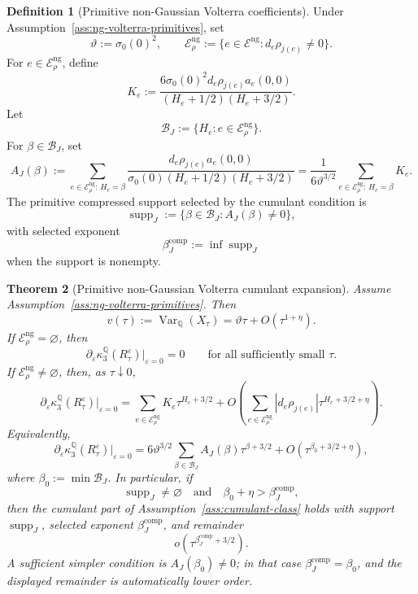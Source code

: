 \documentclass[11pt,a4paper]{amsart}
\theoremstyle{plain}
\newtheorem{theorem}{Theorem}[section]
\theoremstyle{definition}
\newtheorem{definition}[theorem]{Definition}
\theoremstyle{remark}
\DeclareMathOperator{\Var}{Var}
\newcommand{\QQ}{\mathbb{Q}}
\newcommand{\cE}{\mathcal{E}}
\begin{document}
\begin{definition}[Primitive non-Gaussian Volterra coefficients]\label{def:ng-volterra-coefficients}
Under Assumption~\ref{ass:ng-volterra-primitives}, set
\[
        \vartheta:=\sigma_0(0)^2,
        \qquad
        \cE_\rho^{\mathrm{ng}}:=\{e\in\cE^{\mathrm{ng}}:d_e\rho_{j(e)}\ne0\}.
\]
For \(e\in\cE_\rho^{\mathrm{ng}}\), define
\[
        K_e
        :=
        \frac{6\sigma_0(0)^2d_e\rho_{j(e)}a_e(0,0)}{(H_e+1/2)(H_e+3/2)}.
\]
Let
\[
        \mathcal B_J:=\{H_e:e\in\cE_\rho^{\mathrm{ng}}\}.
\]
For \(\beta\in\mathcal B_J\), set
\[
        A_J(\beta)
        :=
        \sum_{e\in\cE_\rho^{\mathrm{ng}}:\,H_e=\beta}
        \frac{d_e\rho_{j(e)}a_e(0,0)}{\sigma_0(0)(H_e+1/2)(H_e+3/2)}
        =
        \frac{1}{6\vartheta^{3/2}}
        \sum_{e\in\cE_\rho^{\mathrm{ng}}:\,H_e=\beta}K_e .
\]
The primitive compressed support selected by the cumulant condition is
\[
        \operatorname{supp}_J:=\{\beta\in\mathcal B_J:A_J(\beta)\ne0\},
\]
with selected exponent
\[
        \beta_J^{\mathrm{comp}}:=\inf \operatorname{supp}_J
\]
when the support is nonempty.
\end{definition}

\begin{theorem}[Primitive non-Gaussian Volterra cumulant expansion]\label{thm:ng-volterra-cumulants}
Assume Assumption~\ref{ass:ng-volterra-primitives}.  Then
\[
        v(\tau):=\Var_\QQ(X_\tau)
        =
        \vartheta\tau+O(\tau^{1+\eta}).
\]
If \(\cE_\rho^{\mathrm{ng}}=\varnothing\), then
\[
        \partial_\varepsilon\kappa_3^\QQ(R_\tau^\varepsilon)\big|_{\varepsilon=0}=0
        \qquad
        \text{for all sufficiently small }\tau.
\]
If \(\cE_\rho^{\mathrm{ng}}\ne\varnothing\), then, as \(\tau\downarrow0\),
\[
        \partial_\varepsilon\kappa_3^\QQ(R_\tau^\varepsilon)\big|_{\varepsilon=0}
        =
        \sum_{e\in\cE_\rho^{\mathrm{ng}}}K_e\tau^{H_e+3/2}
        +
        O\!\left(
                \sum_{e\in\cE_\rho^{\mathrm{ng}}}|d_e\rho_{j(e)}|\tau^{H_e+3/2+\eta}
        \right).
\]
Equivalently,
\[
        \partial_\varepsilon\kappa_3^\QQ(R_\tau^\varepsilon)\big|_{\varepsilon=0}
        =
        6\vartheta^{3/2}
        \sum_{\beta\in\mathcal B_J}A_J(\beta)\tau^{\beta+3/2}
        +
        O(\tau^{\beta_0+3/2+\eta}),
\]
where \(\beta_0:=\min\mathcal B_J\).  In particular, if
\[
        \operatorname{supp}_J\ne\varnothing
        \quad\text{and}\quad
        \beta_0+\eta>\beta_J^{\mathrm{comp}},
\]
then the cumulant part of Assumption~\ref{ass:cumulant-class} holds with support
\(\operatorname{supp}_J\), selected exponent \(\beta_J^{\mathrm{comp}}\), and remainder
\[
        o(\tau^{\beta_J^{\mathrm{comp}}+3/2}).
\]
A sufficient simpler condition is \(A_J(\beta_0)\ne0\); in that case
\(\beta_J^{\mathrm{comp}}=\beta_0\), and the displayed remainder is automatically lower order.
\end{theorem}
\end{document}
